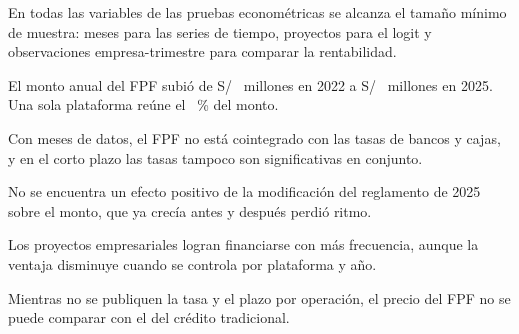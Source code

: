 \begin{puntosclave}
\item En todas las variables de las pruebas econométricas se alcanza el tamaño mínimo de muestra:  meses para las series de tiempo,  proyectos para el logit y  observaciones empresa-trimestre para comparar la rentabilidad.
\item El monto anual del FPF subió de S/~ millones en 2022 a S/~ millones en 2025. Una sola plataforma reúne el ~\% del monto.
\item Con  meses de datos, el FPF no está cointegrado con las tasas de bancos y cajas, y en el corto plazo las tasas tampoco son significativas en conjunto.
\item No se encuentra un efecto positivo de la modificación del reglamento de 2025 sobre el monto, que ya crecía antes y después perdió ritmo.
\item Los proyectos empresariales logran financiarse con más frecuencia, aunque la ventaja disminuye cuando se controla por plataforma y año.
\item Mientras no se publiquen la tasa y el plazo por operación, el precio del FPF no se puede comparar con el del crédito tradicional.
\end{puntosclave}

\begin{abreviaturas}
\end{abreviaturas}

